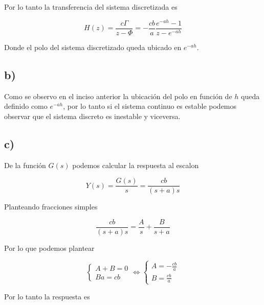\documentclass{article}
\begin{document}
    Por lo tanto la transferencia del sistema discretizada es 

    \begin{equation}
        H(z) = \frac{c\Gamma}{z-\Phi} = -\frac{cb}{a} \frac{e^{-ah}-1}{z - e^{-ah}}
    \end{equation}

    Donde el polo del sistema discretizado queda ubicado en $e^{-ah}$. 

    \subsection{b)}

    Como se observo en el inciso anterior la ubicación del polo en función de $h$ queda definido como $e^{-ah}$, por lo tanto 
    si el sistema continuo es estable podemos observar que el sistema discreto es inestable y viceversa.
    
    \subsection{c)}

    De la función $G(s)$ podemos calcular la respuesta al escalon 

    \begin{equation}
        Y(s) = \frac{G(s)}{s} = \frac{cb}{(s+a)s} 
    \end{equation}

    Planteando fracciones simples 

    \begin{equation}
        \frac{cb}{(s+a)s} = \frac{A}{s} + \frac{B}{s+a}
    \end{equation}

    Por lo que podemos plantear 

    \begin{equation}
        \left\{
            \begin{array}{c}
                A + B = 0 \\
                Ba = cb
            \end{array}
        \right.
        \Leftrightarrow
        \left\{
            \begin{array}{c}
                A = - \frac{cb}{a} \\ 
                B = \frac{cb}{a}
            \end{array}
        \right.
    \end{equation}

    Por lo tanto la respuesta es 
\end{document}
